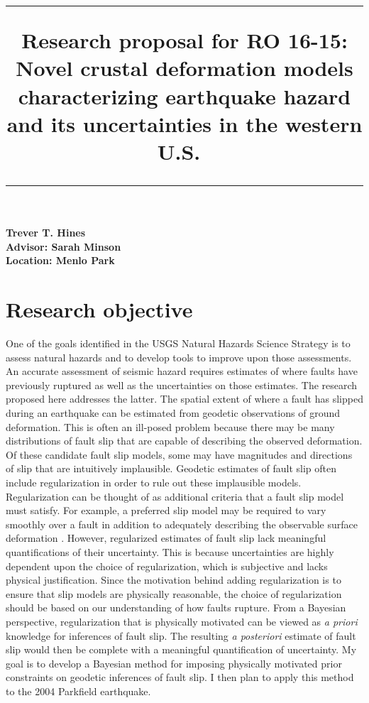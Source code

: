 \documentclass[12pt]{article}
\title{	
 \Large 
 \rule{\headwidth}{1.0pt}
 \raggedright
 \textbf{Research proposal for RO 16-15:
 Novel crustal deformation models
 characterizing earthquake hazard and its uncertainties in the western U.S.}\
 \rule{\headwidth}{1.0pt} 
 \date{}
 \vspace{-8ex}}
\begin{document}
 
 \maketitle
 \thispagestyle{empty}
{\raggedright \large 
 \textbf{Trever T. Hines} \hfill\\
 \textbf{Advisor: Sarah Minson}\hfill\\
 \textbf{Location: Menlo Park}\hfill\\}

\section*{Research objective}
One of the goals identified in the USGS Natural Hazards Science Strategy is to assess natural hazards and to develop tools to improve upon those assessments.  An accurate assessment of seismic hazard requires estimates of where faults have previously ruptured as well as the uncertainties on those estimates.  The research proposed here addresses the latter.  The spatial extent of where a fault has slipped during an earthquake can be estimated from geodetic observations of ground deformation.  This is often an ill-posed problem because there may be many distributions of fault slip that are capable of describing the observed deformation. Of these candidate fault slip models, some may have magnitudes and directions of slip that are intuitively implausible.  Geodetic estimates of fault slip often include regularization in order to rule out these implausible models.  Regularization can be thought of as additional criteria that a fault slip model must satisfy.  For example, a preferred slip model may be required to vary smoothly over a fault in addition to adequately describing the observable surface deformation \citep[e.g.][]{Du1992}.  However, regularized estimates of fault slip lack meaningful quantifications of their uncertainty.  This is because uncertainties are highly dependent upon the choice of regularization, which is subjective and lacks physical justification.  Since the motivation behind adding regularization is to ensure that slip models are physically reasonable, the choice of regularization should be based on our understanding of how faults rupture.  From a Bayesian perspective, regularization that is physically motivated can be viewed as \textit{a priori} knowledge for inferences of fault slip.  The resulting \textit{a posteriori} estimate of fault slip would then be complete with a meaningful quantification of uncertainty.  My goal is to develop a Bayesian method for imposing physically motivated prior constraints on geodetic inferences of fault slip.  I then plan to apply this method to the 2004 Parkfield earthquake.  
\end{document}

